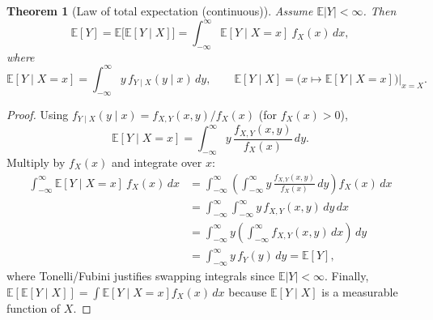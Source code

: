 \documentclass[11pt]{article}
\theoremstyle{plain}
\newtheorem{theorem}{Theorem}[section]
\theoremstyle{definition}
\theoremstyle{remark}
\begin{document}
	\begin{theorem}[Law of total expectation (continuous)]
		Assume \(\mathbb{E}|Y|<\infty\). Then
		\[
		\mathbb{E}[Y]=\mathbb{E}\big[\mathbb{E}[Y\mid X]\big]
		=\int_{-\infty}^{\infty}\mathbb{E}[Y\mid X=x]\ f_X(x)\,dx,
		\]
		where
		\[
		\mathbb{E}[Y\mid X=x]=\int_{-\infty}^{\infty} y\,f_{Y\mid X}(y\mid x)\,dy,
		\qquad
		\mathbb{E}[Y\mid X]=\Big(x\mapsto \mathbb{E}[Y\mid X=x]\Big)\Big|_{x=X}.
		\]
	\end{theorem}
	
	\begin{proof}
		Using \(f_{Y\mid X}(y\mid x)=f_{X,Y}(x,y)/f_X(x)\) (for \(f_X(x)>0\)),
		\[
		\mathbb{E}[Y\mid X=x]=\int_{-\infty}^{\infty} y\,\frac{f_{X,Y}(x,y)}{f_X(x)}\,dy.
		\]
		Multiply by \(f_X(x)\) and integrate over \(x\):
		\begin{align*}
			\int_{-\infty}^{\infty}\mathbb{E}[Y\mid X=x]\ f_X(x)\,dx
			&=\int_{-\infty}^{\infty}\left(\int_{-\infty}^{\infty} y\,\frac{f_{X,Y}(x,y)}{f_X(x)}\,dy\right)f_X(x)\,dx\\
			&=\int_{-\infty}^{\infty}\int_{-\infty}^{\infty} y\,f_{X,Y}(x,y)\,dy\,dx\\
			&=\int_{-\infty}^{\infty} y\left(\int_{-\infty}^{\infty} f_{X,Y}(x,y)\,dx\right)\,dy\\
			&=\int_{-\infty}^{\infty} y\,f_Y(y)\,dy
			=\mathbb{E}[Y],
		\end{align*}
		where Tonelli/Fubini justifies swapping integrals since \(\mathbb{E}|Y|<\infty\).
		Finally, \(\mathbb{E}[\mathbb{E}[Y\mid X]]=\int \mathbb{E}[Y\mid X=x]f_X(x)\,dx\) because \(\mathbb{E}[Y\mid X]\) is a measurable function of \(X\).
	\end{proof}
	
\end{document}
